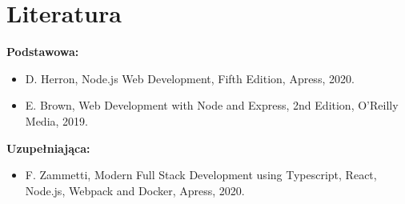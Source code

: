 \documentclass[12pt, a4paper]{article}
\begin{document}
\section{Literatura}

\textbf{Podstawowa:}
\begin{itemize}
  \item D. Herron, Node.js Web Development, Fifth Edition, Apress, 2020.
  \item E. Brown, Web Development with Node and Express, 2nd Edition, O’Reilly Media, 2019.
\end{itemize}

\textbf{Uzupełniająca:}
\begin{itemize}
  \item F. Zammetti, Modern Full Stack Development using Typescript, React, Node.js, Webpack and Docker, Apress, 2020.
\end{itemize}
\end{document}
